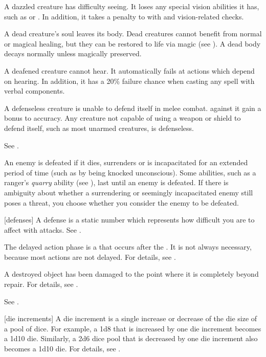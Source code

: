  A dazzled creature has difficulty seeing.
It loses any special vision abilities it has, such as  or .
In addition, it takes a  penalty to  with  and vision-related checks.

 A dead creature's soul leaves its body. Dead creatures cannot benefit from normal or magical healing, but they can be restored to life via magic (see ). A dead body decays normally unless magically preserved.

 A deafened creature cannot hear. It automatically fails at actions which depend on hearing. In addition, it has a 20\% failure chance when casting any spell with verbal components.

 A defenseless creature is unable to defend itself in melee combat.
 against it gain a  bonus to accuracy.
Any creature not capable of using a weapon or shield to defend itself, such as most unarmed creatures, is defenseless.

 See .

 An enemy is defeated if it dies, surrenders or is incapacitated for an extended period of time (such as by being knocked unconscious).
Some abilities, such as a ranger's \textit{quarry} ability (see ), last until an enemy is defeated.
If there is ambiguity about whether a surrendering or seemingly incapacitated enemy still poses a threat, you choose whether you consider the enemy to be defeated.

[defenses] A defense is a static number which represents how difficult you are to affect with attacks. See .

 The delayed action phase is a  that occurs after the .
It is not always necessary, because most actions are not delayed.
For details, see .

 A destroyed object has been damaged to the point where it is completely beyond repair.
For details, see .

 See .

[die increments] A die increment is a single increase or decrease of the die size of a pool of dice.
For example, a 1d8 that is increased by one die increment becomes a 1d10 die.
Similarly, a 2d6 dice pool that is decreased by one die increment also becomes a 1d10 die.
For details, see .

